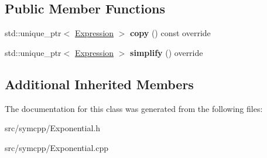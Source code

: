 \subsection*{Public Member Functions}
\begin{DoxyCompactItemize}
\item 
std\+::unique\+\_\+ptr$<$ \hyperlink{classExpression}{Expression} $>$ {\bfseries copy} () const override\hypertarget{classExponential_a85328a45b97cd0f6faa65f55416edc58}{}\label{classExponential_a85328a45b97cd0f6faa65f55416edc58}

\item 
std\+::unique\+\_\+ptr$<$ \hyperlink{classExpression}{Expression} $>$ {\bfseries simplify} () override\hypertarget{classExponential_aed989575d1f53d864fe93de94ddde65c}{}\label{classExponential_aed989575d1f53d864fe93de94ddde65c}

\end{DoxyCompactItemize}
\subsection*{Additional Inherited Members}


The documentation for this class was generated from the following files\+:\begin{DoxyCompactItemize}
\item 
src/symcpp/Exponential.\+h\item 
src/symcpp/Exponential.\+cpp\end{DoxyCompactItemize}
